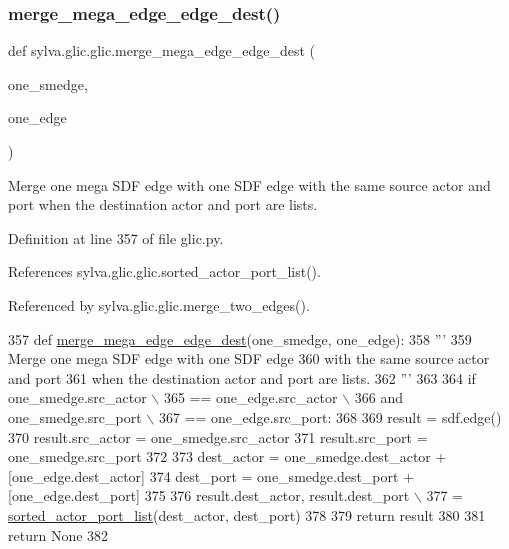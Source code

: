\subsubsection{\texorpdfstring{merge\+\_\+mega\+\_\+edge\+\_\+edge\+\_\+dest()}{merge\_mega\_edge\_edge\_dest()}}
{\footnotesize\ttfamily def sylva.\+glic.\+glic.\+merge\+\_\+mega\+\_\+edge\+\_\+edge\+\_\+dest (\begin{DoxyParamCaption}\item[{}]{one\+\_\+smedge,  }\item[{}]{one\+\_\+edge }\end{DoxyParamCaption})}

\begin{DoxyVerb}  Merge one mega SDF edge with one SDF edge
  with the same source actor and port
  when the destination actor and port are lists.
\end{DoxyVerb}
 

Definition at line 357 of file glic.\+py.



References sylva.\+glic.\+glic.\+sorted\+\_\+actor\+\_\+port\+\_\+list().



Referenced by sylva.\+glic.\+glic.\+merge\+\_\+two\+\_\+edges().


\begin{DoxyCode}
357   \textcolor{keyword}{def }\hyperlink{namespacesylva_1_1glic_1_1glic_aaa193270639d512daa1cf9fc2f952fdb}{merge\_mega\_edge\_edge\_dest}(one\_smedge, one\_edge):
358     \textcolor{stringliteral}{'''}
359 \textcolor{stringliteral}{      Merge one mega SDF edge with one SDF edge}
360 \textcolor{stringliteral}{      with the same source actor and port}
361 \textcolor{stringliteral}{      when the destination actor and port are lists.}
362 \textcolor{stringliteral}{    '''}
363 
364     \textcolor{keywordflow}{if} one\_smedge.src\_actor \(\backslash\)
365             == one\_edge.src\_actor \(\backslash\)
366             \textcolor{keywordflow}{and} one\_smedge.src\_port \(\backslash\)
367             == one\_edge.src\_port:
368 
369       result = sdf.edge()
370       result.src\_actor = one\_smedge.src\_actor
371       result.src\_port = one\_smedge.src\_port
372 
373       dest\_actor = one\_smedge.dest\_actor + [one\_edge.dest\_actor]
374       dest\_port = one\_smedge.dest\_port + [one\_edge.dest\_port]
375 
376       result.dest\_actor, result.dest\_port \(\backslash\)
377           = \hyperlink{namespacesylva_1_1glic_1_1glic_af9c053311339f7220d8a605b492126c0}{sorted\_actor\_port\_list}(dest\_actor, dest\_port)
378 
379       \textcolor{keywordflow}{return} result
380 
381     \textcolor{keywordflow}{return} \textcolor{keywordtype}{None}
382 
\end{DoxyCode}
\mbox{\label{namespacesylva_1_1glic_1_1glic_adaac876d9630352fd0f5e4e3350d5b30}} 
